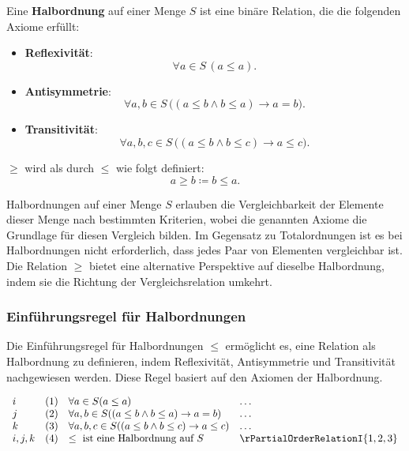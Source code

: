 \documentclass[main.tex]{subfiles}
\begin{document}
\begin{definition}[Halbordnung]
    Eine \textbf{Halbordnung} auf einer Menge \( S \) ist eine binäre Relation, die die folgenden Axiome erfüllt:

    \begin{itemize}
        \item \textbf{Reflexivität}:
        \[
        \forall a \in S \, (a \leq a).
        \]
        
        \item \textbf{Antisymmetrie}: 
        \[
        \forall a, b \in S \, \big( (a \leq b \land b \leq a) \rightarrow a = b \big).
        \]
        
        \item \textbf{Transitivität}: 
        \[
        \forall a, b, c \in S \, \big( (a \leq b \land b \leq c) \rightarrow a \leq c \big).
        \]
    \end{itemize}

    \(\geq\) wird als durch \(\leq\) wie folgt definiert:
    \[
    a \geq b \coloneqq b \leq a.
    \]
\end{definition}

\begin{remark}
    Halbordnungen auf einer Menge \( S \) erlauben die Vergleichbarkeit der Elemente dieser Menge nach bestimmten Kriterien, wobei die genannten Axiome die Grundlage für diesen Vergleich bilden. Im Gegensatz zu Totalordnungen ist es bei Halbordnungen nicht erforderlich, dass jedes Paar von Elementen vergleichbar ist. Die Relation \(\geq\) bietet eine alternative Perspektive auf dieselbe Halbordnung, indem sie die Richtung der Vergleichsrelation umkehrt.
\end{remark}

\subsubsection*{Einführungsregel für Halbordnungen}
\label{rule:rPartialOrderRelationI}
Die Einführungsregel für Halbordnungen \(\leq\) ermöglicht es, eine Relation als Halbordnung zu definieren, indem Reflexivität, Antisymmetrie und Transitivität nachgewiesen werden. Diese Regel basiert auf den Axiomen der Halbordnung.

\[
\begin{array}{llll}
    i       & (1) & \forall a \in S (a \leq a) & \dots \\
    j       & (2) & \forall a, b \in S ((a \leq b \land b \leq a) \rightarrow a = b) & \dots \\
    k       & (3) & \forall a, b, c \in S ((a \leq b \land b \leq c) \rightarrow a \leq c) & \dots \\
    i,j,k   & (4) & \leq \text{ ist eine Halbordnung auf } S & \rPartialOrderRelationI{1,2,3}
\end{array}
\]
\end{document}
